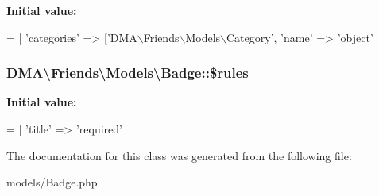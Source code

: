 {\bfseries Initial value\-:}
\begin{DoxyCode}
= [
        \textcolor{stringliteral}{'categories'}    => [\textcolor{stringliteral}{'DMA\(\backslash\)Friends\(\backslash\)Models\(\backslash\)Category'}, \textcolor{stringliteral}{'name'} => \textcolor{stringliteral}{'object'}
\end{DoxyCode}
\hypertarget{classDMA_1_1Friends_1_1Models_1_1Badge_ab750ee2c75af273ca930a12b1a20b3ae}{
\subsubsection[{\$rules}]{\setlength{\rightskip}{0pt plus 5cm}D\-M\-A\textbackslash{}\-Friends\textbackslash{}\-Models\textbackslash{}\-Badge\-::\$rules}}\label{classDMA_1_1Friends_1_1Models_1_1Badge_ab750ee2c75af273ca930a12b1a20b3ae}
{\bfseries Initial value\-:}
\begin{DoxyCode}
= [ 
        \textcolor{stringliteral}{'title'} => \textcolor{stringliteral}{'required'}
\end{DoxyCode}


The documentation for this class was generated from the following file\-:\begin{DoxyCompactItemize}
\item 
models/Badge.\-php\end{DoxyCompactItemize}
